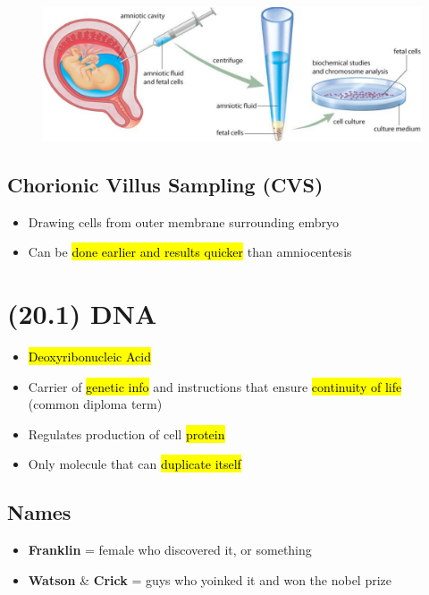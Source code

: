 \documentclass[a4paper,12pt]{article}
\begin{document}
\begin{figure}[H]
    \centering
    \includegraphics[width=\textwidth]{amnio}
\end{figure}

\subsection{Chorionic Villus Sampling (CVS)}
\begin{itemize}
    \item{Drawing cells from outer membrane surrounding embryo}
    \item{Can be \hl{done earlier and results quicker} than amniocentesis}
\end{itemize}

\pagebreak

\section{(20.1) DNA}
\begin{itemize}
    \item{\hl{Deoxyribonucleic Acid}}
    \item{Carrier of \hl{genetic info} and instructions that ensure \hl{continuity of life} \\ (common diploma term)}
    \item{Regulates production of cell \hl{protein}}
    \item{Only molecule that can \hl{duplicate itself}}
\end{itemize}

\subsection{Names}
\begin{itemize}
    \item{\textbf{Franklin} = female who discovered it, or something}
    \item{\textbf{Watson} \& \textbf{Crick} = guys who yoinked it and won the nobel prize}
\end{itemize}
\end{document}
